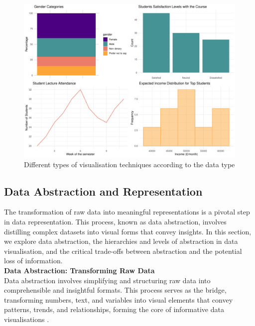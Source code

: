 \documentclass{article}\usepackage[]{graphicx}\usepackage[]{xcolor}
\makeatletter
\def\maxwidth{ %
  \ifdim\Gin@nat@width>\linewidth
    \linewidth
  \else
    \Gin@nat@width
  \fi
}
\newenvironment{knitrout}{}{} %
\numberwithin{equation}{section}
\makeatother
\begin{document}
\begin{knitrout}\scriptsize
{}\color{fgcolor}\begin{figure}[H]

{\centering \includegraphics[width=\maxwidth]{figure/beamer-data-plots-1} 

}

\caption[Different types of visualisation techniques according to the data type]{Different types of visualisation techniques according to the data type}\label{fig:data-plots}
\end{figure}

\end{knitrout}
\subsection{Data Abstraction and Representation}
The transformation of raw data into meaningful representations is a pivotal step in data representation. This process, known as data abstraction, involves distilling complex datasets into visual forms that convey insights. In this section, we explore data abstraction, the hierarchies and levels of abstraction in data visualisation, and the critical trade-offs between abstraction and the potential loss of information.\\

\noindent \textbf{Data Abstraction: Transforming Raw Data}\\
Data abstraction involves simplifying and structuring raw data into comprehensible and insightful formats. This process serves as the bridge, transforming numbers, text, and variables into visual elements that convey patterns, trends, and relationships, forming the core of informative data visualisations \cite{tufte2001visual}.
\end{document}
